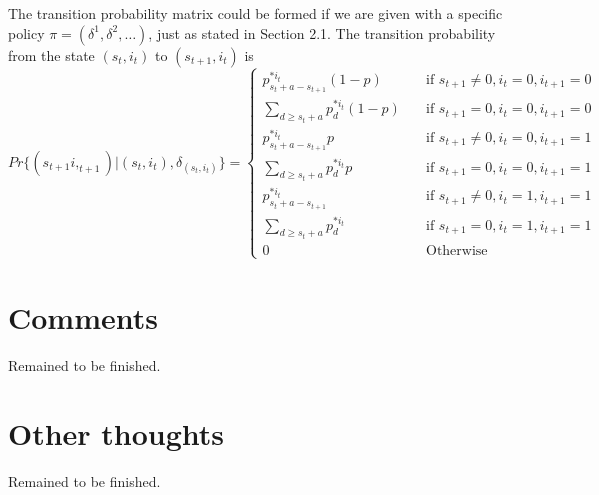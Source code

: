 \documentclass[11pt]{article}
\begin{document}
		The transition probability matrix could be formed if we are given with a specific policy \(\pi=(\delta^1,\delta^2,\dots)\), just as stated in Section 2.1. The transition probability from the state \((s_t,i_t)\) to \((s_{t+1},i_t)\) is \[ Pr\{(s_{t+1}i,_{t+1})|(s_t,i_t),\delta_{(s_t,i_t)}\} = \begin{cases} 
		p^{*i_t}_{s_t+a-s_{t+1}}(1-p) & \quad \text{if } s_{t+1} \neq 0, i_t = 0, i_{t+1} = 0\\ 
		\sum_{d \geq s_t+a} p^{*i_t}_d(1-p) & \quad \text{if } s_{t+1} = 0, i_t=0, i_{t+1} = 0\\ 
		p^{*i_t}_{s_t+a-s_{t+1}}p & \quad \text{if } s_{t+1} \neq 0, i_t = 0, i_{t+1} = 1\\ 
		\sum_{d \geq s_t+a} p^{*i_t}_dp & \quad \text{if } s_{t+1} = 0, i_t=0, i_{t+1} = 1\\ 
		p^{*i_t}_{s_t+a-s_{t+1}} & \quad \text{if } s_{t+1} \neq 0, i_t = 1, i_{t+1} = 1\\ 
		\sum_{d \geq s_t+a} p^{*i_t}_d & \quad \text{if } s_{t+1} = 0, i_t=1, i_{t+1} = 1\\ 
		0 & \quad \text{Otherwise}
		\end{cases} \]

	
\section{Comments}
Remained to be finished.
	
\section{Other thoughts}
Remained to be finished.



	
\end{document}
